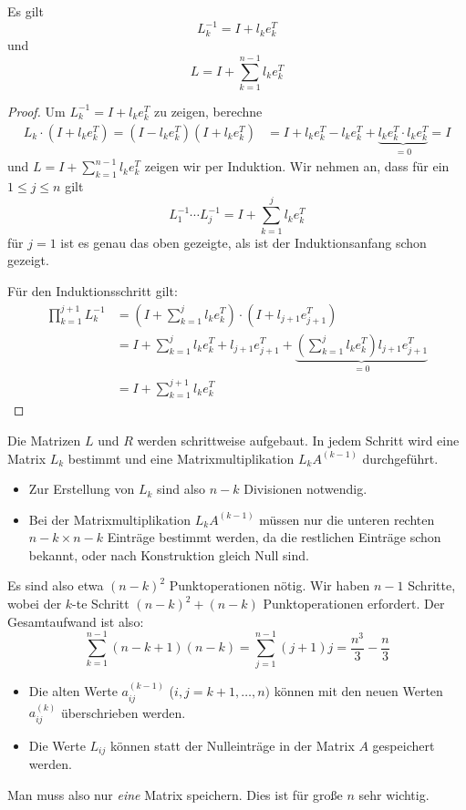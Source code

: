 \documentclass[a4paper]{scrartcl}
\numberwithin{equation}{section}
\begin{document}
\begin{st}
\label{st:3.4}
Es gilt 
\[
L_k^{-1} = I + l_k e_k^T
\]
und
\[
L = I+\sum_{k=1}^{n-1}l_ke_k^T
\]
\begin{proof}
Um $L_k^{-1}=I+l_ke_k^T$ zu zeigen, berechne
\begin{align*}
L_k\cdot (I+l_ke_k^T) =(I-l_ke_k^T)(I+l_ke_k^T) &= I + l_ke_k^T -l_ke_k^T +\underbrace{l_ke_k^T\cdot l_ke_k^T}_{=0} = I
\end{align*}
und $L = I + \sum_{k=1}^{n-1}l_ke_k^T$ zeigen wir per Induktion.
Wir nehmen an, dass für ein $1\le j\le n$ gilt
\[
L_1^{-1}\dotsb L_j^{-1} = I + \sum_{k=1}^j l_ke_k^T
\]
für $j=1$ ist es genau das oben gezeigte, als ist der Induktionsanfang schon gezeigt.

Für den Induktionsschritt gilt:
\begin{align*}
	\prod_{k=1}^{j+1} L_k^{-1} &= \left( I +\sum_{k=1}^j l_ke_k^T\right) \cdot \left( I + l_{j+1}e_{j+1}^T\right)\\
&= I + \sum_{k=1}^j l_ke_k^T + l_{j+1}e_{j+1}^T + \underbrace{\left(\sum_{k=1}^j l_ke_k^T\right)l_{j+1}e_{j+1}^T}_{=0}\\
&= I + \sum_{k=1}^{j+1} l_ke_k^T
\end{align*}
\end{proof}
\end{st}

Die Matrizen $L$ und $R$ werden schrittweise aufgebaut.
In jedem Schritt wird eine Matrix $L_k$ bestimmt und eine Matrixmultiplikation $L_kA^{(k-1)}$ durchgeführt.
\begin{itemize}
\item Zur Erstellung von $L_k$ sind also $n-k$ Divisionen notwendig.
\item Bei der Matrixmultiplikation $L_kA^{(k-1)}$ müssen nur die unteren rechten $n-k\times n-k$ Einträge bestimmt werden,
da die restlichen Einträge schon bekannt, oder nach Konstruktion gleich Null sind.
\end{itemize}
Es sind also etwa $(n-k)^2$ Punktoperationen nötig.
Wir haben $n-1$ Schritte, wobei der $k$-te Schritt $(n-k)^2+(n-k)$ Punktoperationen erfordert.
Der Gesamtaufwand ist also:
\[
\sum_{k=1}^{n-1} (n-k+1)(n-k) = \sum_{j=1}^{n-1}(j+1)j = \frac {n^3}3 - \frac n3
\]

\begin{note}
\begin{itemize}
\item Die alten Werte $a_{ij}^{(k-1)}$ ($i,j=k+1,\dotsc,n)$
können mit den neuen Werten $a_{ij}^{(k)}$ überschrieben werden.
\item Die Werte $L_{ij}$ können statt der Nulleinträge in der Matrix $A$ gespeichert werden.
\end{itemize}
Man muss also nur \emph{eine} Matrix speichern.
Dies ist für große $n$ sehr wichtig.
\end{note}
\end{document}
